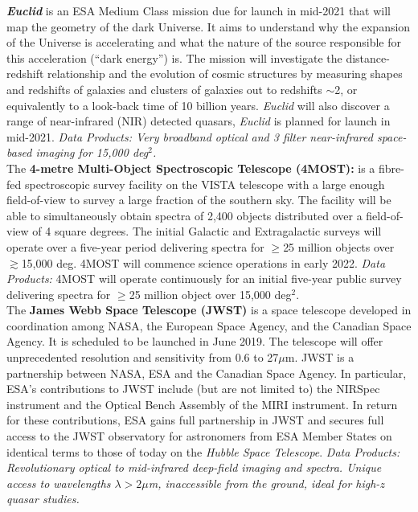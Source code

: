 \begin{framed}
\textit{\textbf{Euclid}} is an ESA Medium Class mission due for launch
in mid-2021 that will map the geometry of the dark Universe.  It aims
to understand why the expansion of the Universe is accelerating and
what the nature of the source responsible for this acceleration
(``dark energy'') is.  The mission will investigate the
distance-redshift relationship and the evolution of cosmic structures
by measuring shapes and redshifts of galaxies and clusters of galaxies
out to redshifts $\sim$2, or equivalently to a look-back time of 10
billion years. {\it Euclid} will also discover a range of
near-infrared (NIR) detected quasars, {\it Euclid} is planned for
launch in mid-2021.  {\it Data Products: Very broadband optical and 3
filter near-infrared space-based imaging for 15,000 deg$^2$.} \\

The {\bf 4-metre Multi-Object Spectroscopic Telescope (4MOST):} is a
fibre-fed spectroscopic survey facility on the VISTA telescope with a
large enough field-of-view to survey a large fraction of the southern
sky. The facility will be able to simultaneously obtain spectra of
2,400 objects distributed over a field-of-view of 4 square degrees.
The initial Galactic and Extragalactic surveys will operate over a
five-year period delivering spectra for $\geq$25 million objects over
$\gtrsim$15,000 deg. 4MOST will commence science operations in early
2022. {\it Data Products: } 4MOST will operate continuously for an
initial five-year public survey delivering spectra for $\geq$25
million object over 15,000 deg$^{2}$.\\

The {\bf James Webb Space Telescope (JWST)} is a space telescope
developed in coordination among NASA, the European Space Agency, and
the Canadian Space Agency. It is scheduled to be launched in June
2019. The telescope will offer unprecedented resolution and
sensitivity from 0.6 to 27$\mu$m. JWST is a partnership between NASA,
ESA and the Canadian Space Agency. In particular, ESA's contributions
to JWST include (but are not limited to) the NIRSpec instrument and
the Optical Bench Assembly of the MIRI instrument.  In return for
these contributions, ESA gains full partnership in JWST and secures
full access to the JWST observatory for astronomers from ESA Member
States on identical terms to those of today on the {\it Hubble Space
Telescope}. {\it Data Products: Revolutionary optical to mid-infrared
deep-field imaging and spectra.  Unique access to wavelengths
$\lambda>2\mu$m, inaccessible from the ground, ideal for high-$z$
quasar studies.} \\



\end{framed}
